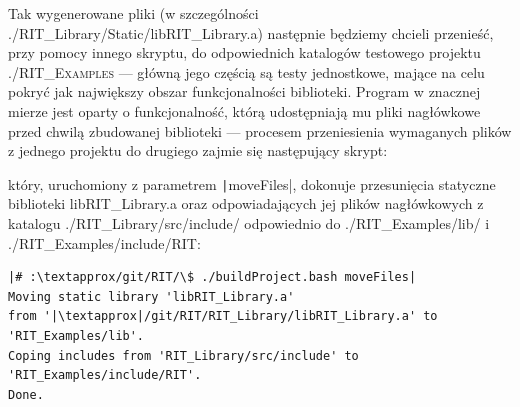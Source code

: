 \small
\noindent{}

Tak wygenerowane pliki (w szczególności \textsf{./RIT\_Library/Static/libRIT\_Library.a}) następnie będziemy chcieli przenieść, przy pomocy innego skryptu, do odpowiednich katalogów testowego projektu \textsc{./RIT\_Examples} --- główną jego częścią są testy jednostkowe, mające na celu pokryć jak największy obszar funkcjonalności biblioteki. Program w znacznej mierze jest oparty o funkcjonalność, którą udostępniają mu pliki nagłówkowe przed chwilą zbudowanej biblioteki --- procesem przeniesienia wymaganych plików z jednego projektu do drugiego zajmie się następujący skrypt:
	
który, uruchomiony z parametrem \texttt|moveFiles|, dokonuje przesunięcia statyczne biblioteki \textsf{libRIT\_Library.a} oraz odpowiadających jej plików nagłówkowych z katalogu \textsf{./RIT\_Library/src/include/} odpowiednio do \textsf{./RIT\_Examples/lib/} i \textsf{./RIT\_Examples/include/RIT}:

\begin{verbatim}
|# :\textapprox/git/RIT/\$ ./buildProject.bash moveFiles|
Moving static library 'libRIT_Library.a' 
from '|\textapprox|/git/RIT/RIT_Library/libRIT_Library.a' to 'RIT_Examples/lib'.
Coping includes from 'RIT_Library/src/include' to 'RIT_Examples/include/RIT'.
Done.
\end{verbatim}

